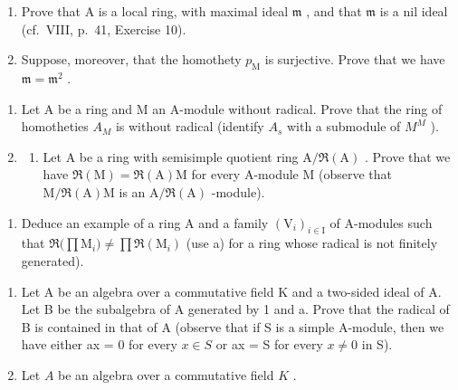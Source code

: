 \begin{enumerate}
\def\labelenumi{\alph{enumi})}
\item
  Prove that A is a local ring, with maximal ideal \(\mathfrak{m}\) , and that \(\mathfrak{m}\) is a nil ideal (cf.~VIII, p.~41, Exercise 10).
\item
  Suppose, moreover, that the homothety \(p_{\mathrm{M}}\) is surjective. Prove that we have \(\mathfrak{m} = \mathfrak{m}^2\) .
\end{enumerate}

\begin{enumerate}
\def\labelenumi{\arabic{enumi})}
\setcounter{enumi}{1}
\item
  Let A be a ring and M an A-module without radical. Prove that the ring of homotheties \(A_{M}\) is without radical (identify \(A_{s}\) with a submodule of \(M^{M}\) ).
\item
  \begin{enumerate}
  \def\labelenumii{\alph{enumii})}
  \tightlist
  \item
    Let A be a ring with semisimple quotient ring \(\mathrm{A} / \Re (\mathrm{A})\) . Prove that we have \(\Re (\mathrm{M}) = \Re (\mathrm{A})\mathrm{M}\) for every A-module M (observe that \(\mathrm{M} / \Re (\mathrm{A})\mathrm{M}\) is an \(\mathrm{A} / \Re (\mathrm{A})\) -module).
  \end{enumerate}
\end{enumerate}

\begin{enumerate}
\def\labelenumi{\alph{enumi})}
\setcounter{enumi}{1}
\tightlist
\item
  Deduce an example of a ring A and a family \((\mathrm{V}_{i})_{i\in\mathrm{I}}\) of A-modules such that \(\Re\big(\prod\mathrm{M}_{i}\big)\neq\prod\Re(\mathrm{M}_{i})\) (use a) for a ring whose radical is not finitely generated).
\end{enumerate}

\begin{enumerate}
\def\labelenumi{\arabic{enumi})}
\setcounter{enumi}{3}
\item
  Let A be an algebra over a commutative field K and a two-sided ideal of A. Let B be the subalgebra of A generated by 1 and a. Prove that the radical of B is contained in that of A (observe that if S is a simple A-module, then we have either ax = 0 for every \(x \in S\) or ax = S for every \(x \neq 0\) in S).
\item
  Let \(A\) be an algebra over a commutative field \(K\) .
\end{enumerate}


